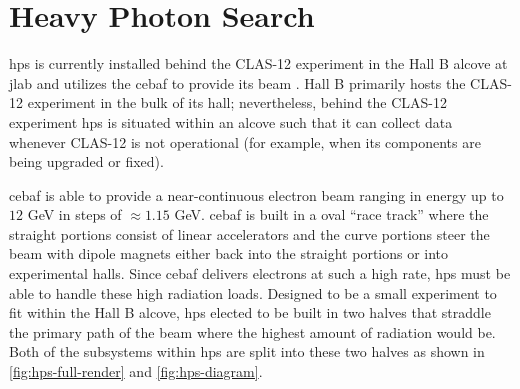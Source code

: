\chapter{Heavy Photon Search}
\label{chapter:hps:experiment}

\ac{hps} is currently installed behind the CLAS-12 experiment in the Hall B
alcove at \ac{jlab} and utilizes the \ac{cebaf} to provide its beam
\cite{mrsolt-thesis-2020,skmccarty-thesis-2020}.
Hall B primarily hosts the CLAS-12 experiment 
in the bulk of its hall; nevertheless, behind the CLAS-12 experiment \ac{hps} is situated
within an alcove such that it can collect data whenever CLAS-12 is not operational (for example,
when its components are being upgraded or fixed).

\ac{cebaf} \cite{cebaf-12GeV-2012,cebaf-opportunities-2012,cebaf-2013} is able to
provide a near-continuous electron beam ranging in energy up to $12$ GeV in steps
of $\approx 1.15$ GeV. \ac{cebaf} is built in a oval ``race track'' where the straight
portions consist of linear accelerators and the curve portions steer the beam with
dipole magnets either back into the straight portions or into experimental halls.
Since \ac{cebaf} delivers electrons at such a high rate, \ac{hps} must be able to
handle these high radiation loads. Designed to be a small experiment to fit within
the Hall B alcove, \ac{hps} elected to be built in two halves that straddle the primary
path of the beam where the highest amount of radiation would be. Both of the subsystems
within \ac{hps} are split into these two halves as shown in \cref{fig:hps-full-render}
and \cref{fig:hps-diagram}.

